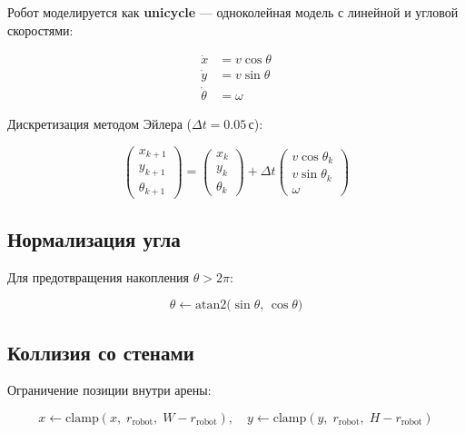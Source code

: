 Робот моделируется как \textbf{unicycle} --- одноколейная модель
с линейной и угловой скоростями:

\begin{align}
  \dot{x}      &= v \cos\theta \label{eq:sim_dx}\\
  \dot{y}      &= v \sin\theta \label{eq:sim_dy}\\
  \dot{\theta}  &= \omega       \label{eq:sim_dtheta}
\end{align}

Дискретизация методом Эйлера ($\Delta t = 0.05\,\text{с}$):

\begin{equation}
  \boxed{
  \begin{pmatrix} x_{k+1} \\ y_{k+1} \\ \theta_{k+1} \end{pmatrix}
  = \begin{pmatrix} x_k \\ y_k \\ \theta_k \end{pmatrix}
  + \Delta t \begin{pmatrix} v\cos\theta_k \\ v\sin\theta_k \\ \omega \end{pmatrix}
  }
  \label{eq:sim_euler}
\end{equation}

\subsection{Нормализация угла}

Для предотвращения накопления $\theta > 2\pi$:

\begin{equation}
  \theta \leftarrow \mathrm{atan2}\!\bigl(\sin\theta,\, \cos\theta\bigr)
  \label{eq:theta_norm}
\end{equation}

\subsection{Коллизия со стенами}

Ограничение позиции внутри арены:

\begin{equation}
  x \leftarrow \mathrm{clamp}(x,\; r_{\text{robot}},\; W - r_{\text{robot}}), \quad
  y \leftarrow \mathrm{clamp}(y,\; r_{\text{robot}},\; H - r_{\text{robot}})
  \label{eq:wall_collision}
\end{equation}


